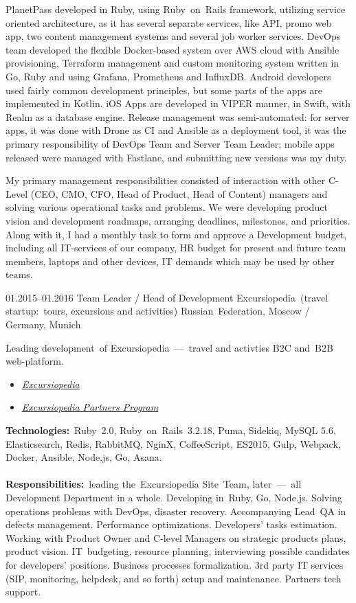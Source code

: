 \documentclass[12pt,a4paper,final]{moderncv}
\begin{document}
{{    PlanetPass developed in Ruby, using Ruby~on~Rails framework, utilizing service oriented architecture, as it has several separate services, like API, promo web app, two content management systems and several job worker services. DevOps team developed the flexible Docker-based system over AWS cloud with Ansible provisioning, Terraform management and custom monitoring system written in Go, Ruby and using Grafana, Prometheus and InfluxDB. Android developers used fairly common development principles, but some parts of the apps are implemented in Kotlin. iOS Apps are developed in VIPER manner, in Swift, with Realm as a database engine. Release management was semi-automated: for server apps, it was done with Drone as CI and Ansible as a deployment tool, it was the primary responsibility of DevOps Team and Server Team Leader; mobile apps released were managed with Fastlane, and submitting new versions was my duty.

    My primary management responsibilities consisted of interaction with other C-Level (CEO, CMO, CFO, Head of Product, Head of Content) managers and solving various operational tasks and problems. We were developing product vision and development roadmaps, arranging deadlines, milestones, and priorities. Along with it, I had a monthly task to form and approve a Development budget, including all IT-services of our company, HR budget for present and future team members, laptops and other devices, IT demands which may be used by other teams.
  }
}

\cventry
{01.2015--01.2016}
{Team Leader / Head of Development}
{Excursiopedia~(travel startup:~tours, excursions and activities)}
{Russian~Federation, Moscow / Germany, Munich}
{}
{
  Leading development~of Excursiopedia~---~travel and activties B2C and~B2B web-platform.
  \bigskip
  \begin{itemize}
    \item \underline{\href{https://www.excursiopedia.com}{\itshape Excursiopedia}}
    \item \underline{\href{https://partners.excursiopedia.com}{\itshape Excursiopedia Partners Program}}
  \end{itemize}
  \bigskip
  \textbf{Technologies:}~Ruby~2.0, Ruby~on~Rails~3.2.18, Puma, Sidekiq, MySQL 5.6, Elasticsearch, Redis, RabbitMQ, NginX, CoffeeScript, ES2015, Gulp, Webpack, Docker, Ansible, Node.js, Go, Asana.
  \\\\
  \textbf{Responsibilities:}~leading the~Excursiopedia Site~Team, later~---~all Development Department in a whole. Developing in~Ruby, Go, Node.js. Solving operations problems with DevOps, disaster recovery. Accompanying Lead~QA in defects management. Performance optimizations. Developers' tasks estimation. Working with Product Owner and C-level Managers on strategic products plans, product vision. IT~budgeting, resource planning, interviewing possible candidates for developers' positions. Business processes formalization. 3rd party IT services (SIP, monitoring, helpdesk, and so forth) setup and maintenance. Partners tech support.
}
\end{document}
